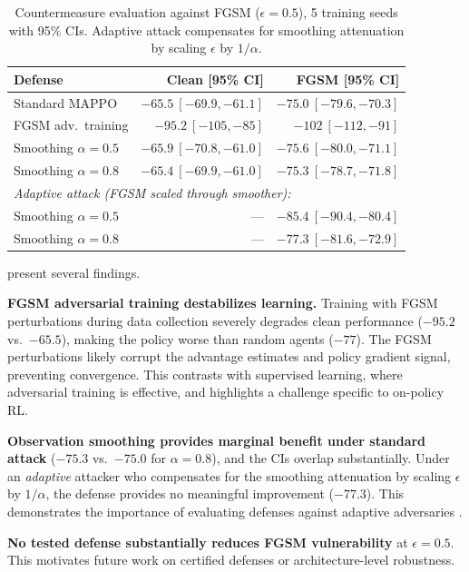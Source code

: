 \documentclass[12pt,a4paper]{article}
\begin{document}
\begin{table}[H]
\centering
\caption{Countermeasure evaluation against FGSM ($\epsilon = 0.5$), 5 training seeds with 95\% CIs. Adaptive attack compensates for smoothing attenuation by scaling $\epsilon$ by $1/\alpha$.}
\label{tab:counter}
\begin{tabular}{lrr}
\toprule
Defense & Clean [95\% CI] & FGSM [95\% CI] \\
\midrule
Standard MAPPO & $-65.5\ [-69.9, -61.1]$ & $-75.0\ [-79.6, -70.3]$ \\
FGSM adv.\ training & $-95.2\ [-105, -85]$ & $-102\ [-112, -91]$ \\
Smoothing $\alpha = 0.5$ & $-65.9\ [-70.8, -61.0]$ & $-75.6\ [-80.0, -71.1]$ \\
Smoothing $\alpha = 0.8$ & $-65.4\ [-69.9, -61.0]$ & $-75.3\ [-78.7, -71.8]$ \\
\midrule
\multicolumn{3}{l}{\textit{Adaptive attack (FGSM scaled through smoother):}} \\
Smoothing $\alpha = 0.5$ & --- & $-85.4\ [-90.4, -80.4]$ \\
Smoothing $\alpha = 0.8$ & --- & $-77.3\ [-81.6, -72.9]$ \\
\bottomrule
\end{tabular}
\end{table}

 present several findings.

\textbf{FGSM adversarial training destabilizes learning.} Training with FGSM perturbations during data collection severely degrades clean performance ($-95.2$ vs.\ $-65.5$), making the policy worse than random agents ($-77$). The FGSM perturbations likely corrupt the advantage estimates and policy gradient signal, preventing convergence. This contrasts with supervised learning, where adversarial training is effective, and highlights a challenge specific to on-policy RL.

\textbf{Observation smoothing provides marginal benefit under standard attack} ($-75.3$ vs.\ $-75.0$ for $\alpha = 0.8$), and the CIs overlap substantially. Under an \emph{adaptive} attacker who compensates for the smoothing attenuation by scaling $\epsilon$ by $1/\alpha$, the defense provides no meaningful improvement ($-77.3$). This demonstrates the importance of evaluating defenses against adaptive adversaries \citep{madry2018towards}.

\textbf{No tested defense substantially reduces FGSM vulnerability} at $\epsilon = 0.5$. This motivates future work on certified defenses or architecture-level robustness.
\end{document}
